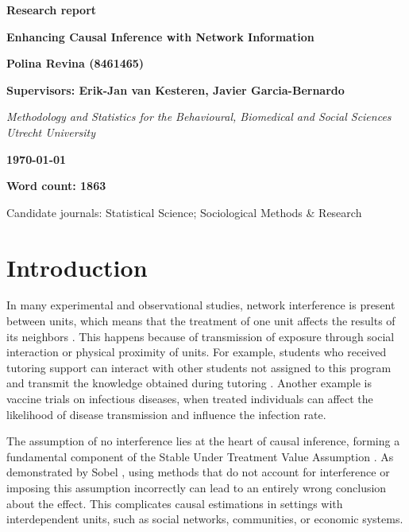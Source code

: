 \documentclass[a4paper,11pt]{article}
\begin{document}
\begin{titlepage}
    \centering
    \vspace*{2cm}
    
    \textbf{\Large Research report}
    
    \vspace{2cm}
    
    \textbf{\Huge Enhancing Causal Inference with Network Information}
    
    \vfill
    
    \textbf{Polina Revina (8461465)}
    
    \vspace{0.5cm}
    
    \textbf{Supervisors: Erik-Jan van Kesteren, Javier Garcia-Bernardo}
    
    \vspace{0.5cm}
    
    \textit{Methodology and Statistics for the Behavioural, Biomedical and Social Sciences\\
    Utrecht University}
    
    \vfill
    \textbf{\today}
    \vspace{0.5cm}
    
    \textbf{Word count: 1863}
    \vspace{0.5cm}
    
    Candidate journals: Statistical Science; Sociological Methods \& Research \\ 
    
\end{titlepage}
\nocite{*}

\section{Introduction}
In many experimental and observational studies, network interference is present between units, which means that the treatment of one unit affects the results of its neighbors \cite{cox1958planning}. This happens because of transmission of exposure through social interaction or physical proximity of units. For example, students who received tutoring support can interact with other students not assigned to this program and transmit the knowledge obtained during tutoring \cite{forastiere2021identification}. Another example is vaccine trials on infectious diseases, when treated individuals can affect the likelihood of disease transmission and influence the infection rate.

The assumption of no interference lies at the heart of causal inference, forming a fundamental component of the Stable Under Treatment Value Assumption \cite{rubin1974estimating}. As demonstrated by Sobel \citeyear{sobel2006randomized}, using methods that do not account for interference or imposing this assumption incorrectly can lead to an entirely wrong conclusion about the effect. This complicates causal estimations in settings with interdependent units, such as social networks, communities, or economic systems.
\end{document}
